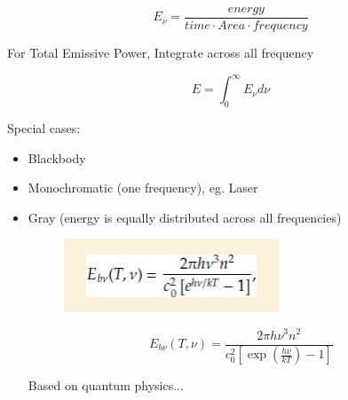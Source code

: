 \documentclass[12pt]{article}
\renewcommand{\_}{\kern-1.5pt\textunderscore\kern-1.5pt}
\begin{document}
 \[ E_{ \nu }=\frac{energy}{time \cdot Area \cdot frequency} \] \par

For Total Emissive Power, Integrate across all frequency\par

 \[ E= \int _{0}^{\infty}E_{ \nu } d \nu  \] \par


\vspace{\baselineskip}
Special cases:\par

\begin{itemize}
	\item Blackbody\par

	\item Monochromatic (one frequency), eg. Laser\par

	\item Gray (energy is equally distributed across all frequencies)\par




\begin{figure}[H]
	\begin{Center}
		\includegraphics[width=2.53in,height=0.86in]{./media/image6.png}
	\end{Center}
\end{figure}



\par

 \[ E_{b \nu } \left( T, \nu  \right) =\frac{2 \pi h \nu ^{3}n^{2}}{c_{0}^{2} \left[ \exp  \left( \frac{h \nu }{kT} \right) -1 \right] } \] \par

Based on quantum physics$ \ldots $ \par





\end{itemize}
\end{document}
